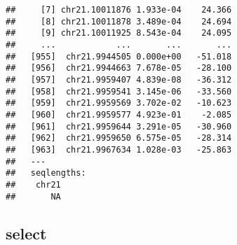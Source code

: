 \documentclass{article}
\makeatletter
\newenvironment{kframe}{%
 \def\FrameCommand##1{\hskip\@totalleftmargin \hskip-\fboxsep
 \colorbox{shadecolor}{##1}\hskip-\fboxsep
     \hskip-\linewidth \hskip-\@totalleftmargin \hskip\columnwidth}%
 \MakeFramed {\advance\hsize-\width
   \@totalleftmargin\z@ \linewidth\hsize
   \@setminipage}}%
 {\par\unskip\endMakeFramed}
\newenvironment{knitrout}{}{} %
\makeatother
\begin{document}
\begin{knitrout}
\begin{kframe}
\begin{verbatim}
##     [7] chr21.10011876 1.933e-04    24.366
##     [8] chr21.10011878 3.489e-04    24.694
##     [9] chr21.10011925 8.543e-04    24.095
##     ...            ...       ...       ...
##   [955]  chr21.9944505 0.000e+00   -51.018
##   [956]  chr21.9944663 7.678e-05   -28.100
##   [957]  chr21.9959407 4.839e-08   -36.312
##   [958]  chr21.9959541 3.145e-06   -33.560
##   [959]  chr21.9959569 3.702e-02   -10.623
##   [960]  chr21.9959577 4.923e-01    -2.085
##   [961]  chr21.9959644 3.291e-05   -30.960
##   [962]  chr21.9959650 6.575e-05   -28.314
##   [963]  chr21.9967634 1.028e-03   -25.863
##   ---
##   seqlengths:
##    chr21
##       NA
\end{verbatim}
\end{kframe}
\end{knitrout}

\subsection{select}
\end{document}
